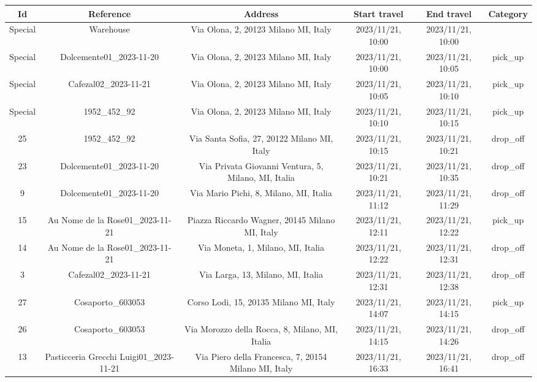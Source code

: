 \documentclass[titlepage]{article}
\begin{document}
\begin{table}[H]
\centering
\begin{adjustbox}{max width=\textwidth}
\begin{tabular}{|c|c|c|c|c|c|}
\hline
Id & Reference & Address & Start travel & End travel & Category\\
\hline
\hline
Special & Warehouse & Via Olona, 2, 20123 Milano MI, Italy & 2023/11/21, 10:00 & 2023/11/21, 10:00 & \\
\hline
Special & Dolcemente01\_2023-11-20 & Via Olona, 2, 20123 Milano MI, Italy & 2023/11/21, 10:00 & 2023/11/21, 10:05 & pick\_up \\
\hline
Special & Cafezal02\_2023-11-21 & Via Olona, 2, 20123 Milano MI, Italy & 2023/11/21, 10:05 & 2023/11/21, 10:10 & pick\_up \\
\hline
Special & 1952\_452\_92 & Via Olona, 2, 20123 Milano MI, Italy & 2023/11/21, 10:10 & 2023/11/21, 10:15 & pick\_up \\
\hline
25 & 1952\_452\_92 & Via Santa Sofia, 27, 20122 Milano MI, Italy & 2023/11/21, 10:15 & 2023/11/21, 10:21 & drop\_off \\
\hline
23 & Dolcemente01\_2023-11-20 & Via Privata Giovanni Ventura, 5, Milano, MI, Italia & 2023/11/21, 10:21 & 2023/11/21, 10:35 & drop\_off \\
\hline
9 & Dolcemente01\_2023-11-20 & Via Mario Pichi, 8, Milano, MI, Italia & 2023/11/21, 11:12 & 2023/11/21, 11:29 & drop\_off \\
\hline
15 & Au Nome de la Rose01\_2023-11-21 & Piazza Riccardo Wagner, 20145 Milano MI, Italy & 2023/11/21, 12:11 & 2023/11/21, 12:22 & pick\_up \\
\hline
14 & Au Nome de la Rose01\_2023-11-21 & Via Moneta, 1, Milano, MI, Italia & 2023/11/21, 12:22 & 2023/11/21, 12:31 & drop\_off \\
\hline
3 & Cafezal02\_2023-11-21 & Via Larga, 13, Milano, MI, Italia & 2023/11/21, 12:31 & 2023/11/21, 12:38 & drop\_off \\
\hline
27 & Cosaporto\_603053 & Corso Lodi, 15, 20135 Milano MI, Italy & 2023/11/21, 14:07 & 2023/11/21, 14:15 & pick\_up \\
\hline
26 & Cosaporto\_603053 & Via Morozzo della Rocca, 8, Milano, MI, Italia & 2023/11/21, 14:15 & 2023/11/21, 14:26 & drop\_off \\
\hline
13 & Pasticceria Grecchi Luigi01\_2023-11-21 & Via Piero della Francesca, 7, 20154 Milano MI, Italy & 2023/11/21, 16:33 & 2023/11/21, 16:41 & drop\_off \\
\hline

\end{tabular}
\end{adjustbox}
\end{table}
\end{document}
